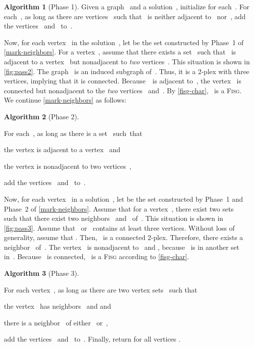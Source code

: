 \documentclass[12pt, a4paper, abstracton]{scrreprt}
\newcommand{\FISG}{\textsc{Fisg}}
\newcounter{theorem}
\theoremstyle{definition}
\newtheorem{proc}{Algorithm}[chapter]
\theoremstyle{remark}
\begin{document}
\begin{proc}[Phase 1]\label{mark-neighbors}
  Given a graph~ and a solution~, initialize  for each~. For each~, as long as there are vertices~ such that ~is neither adjacent to~ nor~, add the vertices~ and~ to~.
\end{proc}\setcounter{proc}{1}

\noindent Now, for each vertex~ in the solution~, let  be the set constructed by Phase~1 of \autoref{mark-neighbors}. For a vertex~, assume that there exists a set~ such that~ is adjacent to a vertex~ but nonadjacent to \emph{two} vertices~. This situation is shown in \autoref{fig:pass2}. The graph~ is an induced subgraph of~. Thus, it is a 2-plex with three vertices, implying that it is connected. Because~~is adjacent to~, the vertex~ is connected but nonadjacent to the \emph{two} vertices~ and~. By \autoref{fisg-char}, ~is a \FISG{}. We continue \autoref{mark-neighbors} as follows:

\begin{proc}[Phase 2]
  \begin{samepage}
    For each~, as long as there is a set~ such~that
    \begin{compactenum}
    \item the vertex  is adjacent to a vertex~ and
    \item the vertex  is nonadjacent to two vertices~,
    \end{compactenum}
    add the vertices~ and~ to~.
  \end{samepage}
\end{proc}\setcounter{proc}{1}  

\noindent Now, for each vertex~ in a solution~, let  be the set constructed by Phase~1 and Phase~2 of \autoref{mark-neighbors}. Assume that for a vertex~, there exist two sets~ such that there exist two neighbors~ and~ of~. This situation is shown in \autoref{fig:pass3}. Assume that~ or~ contains at least three vertices. Without loss of generality, assume that . Then, ~is a connected 2-plex. Therefore, there exists a neighbor~ of~. The vertex~ is nonadjacent to~ and , because~ is in another set in~. Because ~is connected, ~is a \FISG{} according to \autoref{fisg-char}.

\begin{proc}[Phase 3]
  \begin{samepage}
  For each vertex~, as long as there are two vertex
  sets~ such that
  \begin{compactenum}
  \item the vertex~ has neighbors~ and  and
  \item there is a neighbor~ of either~ or~,
  \end{compactenum}
  add the vertices~ and~ to~. Finally, return  for all vertices .
  \end{samepage}
\end{proc}
\end{document}
